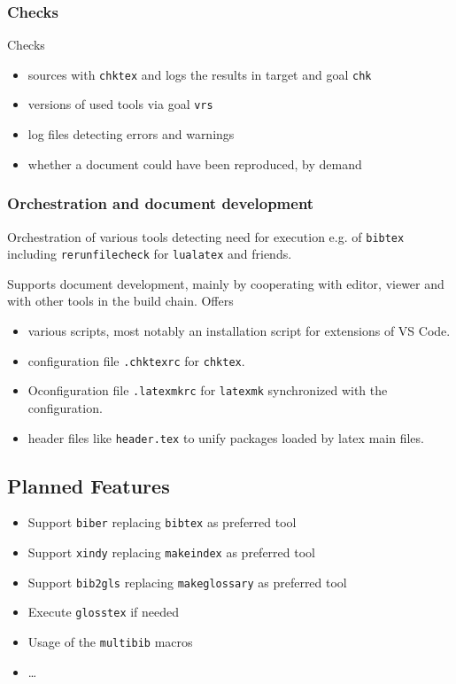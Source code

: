 \documentclass[a4paper,notumble,10pt,english]{leaflet}%
\begin{document}
\subsubsection{Checks}

Checks 
%
\begin{itemize}
  \item
  sources with \texttt{chktex} and logs the results in target and goal \texttt{chk} 
  \item
  versions of used tools via goal \texttt{vrs} 
  \item
  log files detecting errors and warnings 
  \item
  whether a document could have been reproduced, by demand 
\end{itemize}


\subsubsection{Orchestration and document development}

Orchestration of various tools detecting need for execution e.g.
of \texttt{bibtex} including \texttt{rerunfilecheck} for \texttt{lualatex} and friends.

Supports document development, mainly by cooperating with editor, viewer and with other tools in the build chain. 
Offers 
%
\begin{itemize}
  \item various scripts, 
  most notably an installation script for extensions of VS Code.
  \item configuration file \texttt{.chktexrc} for \texttt{chktex}.
  \item Oconfiguration file \texttt{.latexmkrc} 
  for \texttt{latexmk} synchronized with the configuration.
  \item header files like \texttt{header.tex} 
  to unify packages loaded by latex main files.
\end{itemize}

\subsection{Planned Features}

\begin{itemize}
  \item Support \texttt{biber} replacing \texttt{bibtex} as preferred tool
  \item Support \texttt{xindy} replacing \texttt{makeindex} as preferred tool
  \item Support \texttt{bib2gls} replacing \texttt{makeglossary} as preferred tool
  \item Execute \texttt{glosstex} if needed
  \item Usage of the \texttt{multibib} macros
  \item \dots
  \end{itemize}
\end{document}
